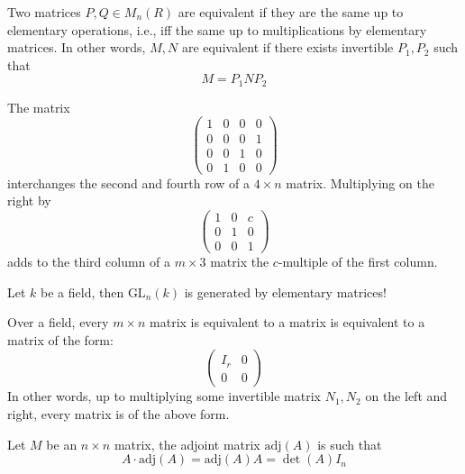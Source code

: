 \documentclass[openany]{book}
\begin{document}
\begin{prop}
    Two matrices $P,Q\in M_{n}(R)$ are equivalent if they are the same up to elementary operations, i.e., iff the same up to multiplications by elementary matrices. In other words, $M,N$ are equivalent if there exists invertible $P_1,P_2$ such that 
    \begin{equation*}
        M=P_1NP_2
    \end{equation*}
\end{prop}
\begin{example}
    The matrix
\[
\begin{pmatrix}
1 & 0 & 0 & 0 \\
0 & 0 & 0 & 1 \\
0 & 0 & 1 & 0 \\
0 & 1 & 0 & 0
\end{pmatrix}
\]
interchanges the second and fourth row of a \(4 \times n\) matrix. Multiplying on the right by
\[
\begin{pmatrix}
1 & 0 & c \\
0 & 1 & 0 \\
0 & 0 & 1
\end{pmatrix}
\]
adds to the third column of a \(m \times 3\) matrix the \(c\)-multiple of the first column.
\end{example}

\begin{prop}
    Let $k$ be a field, then $\text{GL}_n(k)$ is generated by elementary matrices!
\end{prop}

\begin{prop}
    Over a field, every $m\times n$ matrix is equivalent to a matrix is equivalent to a matrix of the form:
    \[ 
\left( 
\begin{array}{c|c} 
I_r & 0 \\ 
\hline 
0 & 0 
\end{array} 
\right) 
\]
 In other words, up to multiplying some invertible matrix $N_1,N_2$ on the left and right, every matrix is of the above form.
\end{prop}


\begin{defn}
    Let $M$ be an $n\times n$ matrix, the adjoint matrix $\text{adj}(A)$ is such that 
    \begin{equation*}
        A\cdot\text{adj}(A)=\text{adj}(A)A=\det(A)I_n
    \end{equation*}
\end{defn}
\end{document}
